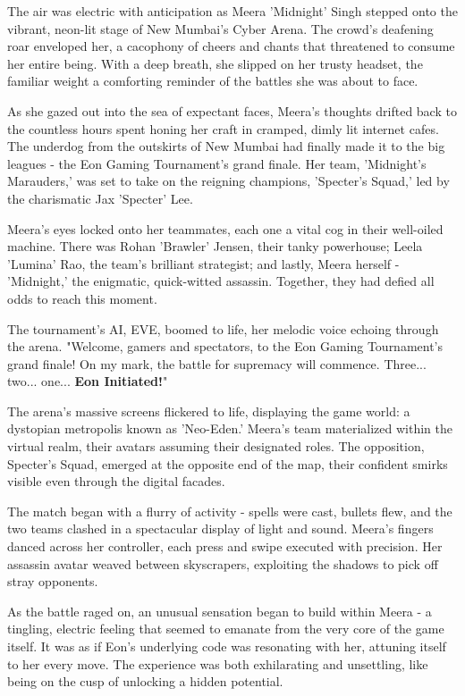 \documentclass[12pt]{report}  %
\begin{document}
The air was electric with anticipation as Meera 'Midnight' Singh stepped
onto the vibrant, neon-lit stage of New Mumbai's Cyber Arena. The
crowd's deafening roar enveloped her, a cacophony of cheers and chants
that threatened to consume her entire being. With a deep breath, she
slipped on her trusty headset, the familiar weight a comforting reminder
of the battles she was about to face.

As she gazed out into the sea of expectant faces, Meera's thoughts
drifted back to the countless hours spent honing her craft in cramped,
dimly lit internet cafes. The underdog from the outskirts of New Mumbai
had finally made it to the big leagues - the Eon Gaming Tournament's
grand finale. Her team, 'Midnight's Marauders,' was set to take on the
reigning champions, 'Specter's Squad,' led by the charismatic Jax
'Specter' Lee.

Meera's eyes locked onto her teammates, each one a vital cog in their
well-oiled machine. There was Rohan 'Brawler' Jensen, their tanky
powerhouse; Leela 'Lumina' Rao, the team's brilliant strategist; and
lastly, Meera herself - 'Midnight,' the enigmatic, quick-witted
assassin. Together, they had defied all odds to reach this moment.

The tournament's AI, EVE, boomed to life, her melodic voice echoing
through the arena. "Welcome, gamers and spectators, to the Eon Gaming
Tournament's grand finale! On my mark, the battle for supremacy will
commence. Three... two... one... \textbf{Eon Initiated!}"

The arena's massive screens flickered to life, displaying the game
world: a dystopian metropolis known as 'Neo-Eden.' Meera's team
materialized within the virtual realm, their avatars assuming their
designated roles. The opposition, Specter's Squad, emerged at the
opposite end of the map, their confident smirks visible even through the
digital facades.

The match began with a flurry of activity - spells were cast, bullets
flew, and the two teams clashed in a spectacular display of light and
sound. Meera's fingers danced across her controller, each press and
swipe executed with precision. Her assassin avatar weaved between
skyscrapers, exploiting the shadows to pick off stray opponents.

As the battle raged on, an unusual sensation began to build within Meera
- a tingling, electric feeling that seemed to emanate from the very core
of the game itself. It was as if Eon's underlying code was resonating
with her, attuning itself to her every move. The experience was both
exhilarating and unsettling, like being on the cusp of unlocking a
hidden potential.
\end{document}
